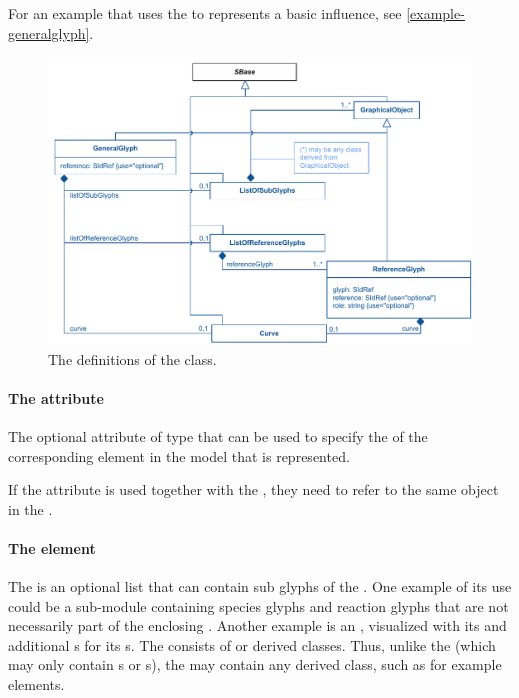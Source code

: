 For an example that uses the \GeneralGlyph to represents a basic influence,
see \ref{example-generalglyph}.

\begin{figure}[ht]
\includegraphics[scale=0.925]{uml/layout-generalglyph-model-uml}
\caption{The definitions of the \GeneralGlyph class.}
\label{uml:generalglyph}
\end{figure}

\paragraph{The  attribute}
The optional  attribute of type  that 
can be used to specify the  of the corresponding element in 
the model that is represented. 

If the  attribute is used together with the , 
they need to refer to the same object in the \Model.

\paragraph {The  element}
\label{listofsubglyphs-class}
The \ListOfSubGlyphs is an optional list that can contain sub glyphs of 
the \GeneralGlyph. One example of its use could be a sub-module  
containing species glyphs and reaction glyphs that are not necessarily 
part of the enclosing \Model. Another example is an \Event, 
visualized with its \Trigger and additional {\GeneralGlyph}s for its 
{\EventAssignment}s. The \ListOfSubGlyphs consists of \GraphicalObject 
or derived classes. Thus, unlike the \ListOfAdditionalGraphicalObjects 
(which may only contain {\GraphicalObject}s or {\GeneralGlyph}s), the 
 may contain any derived class, such as for 
example \TextGlyph elements. 

